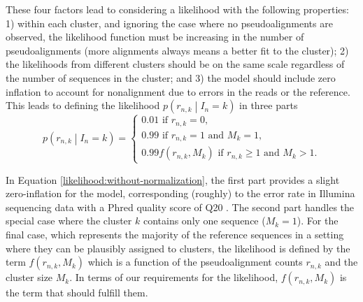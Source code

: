 \documentclass[officiallayout]{tktla}
\begin{document}
These four factors lead to considering a likelihood with the following
properties: 1) within each cluster, and ignoring the case where no
pseudoalignments are observed, the likelihood function must be
increasing in the number of pseudoalignments (more alignments always
means a better fit to the cluster); 2) the likelihoods from different
clusters should be on the same scale regardless of the number of
sequences in the cluster; and 3) the model should include zero
inflation to account for nonalignment due to errors in the reads or
the reference. This leads to defining the likelihood $p\left(r_{n,
  k} \middle| I_{n} = k\right)$ in three parts
\begin{equation}
  \label{likelihood:without-normalization}
  p\left(r_{n, k} \middle| I_{n} = k\right) =
  \begin{cases}
    0.01\text{ if } r_{n, k} = 0, \\
    0.99\text{ if } r_{n, k} = 1 \text{ and } M_{k} = 1, \\
    0.99f\left(r_{n, k}, M_{k}\right)\text{ if } r_{n, k} \geq 1\text{ and } M_{k} > 1.
  \end{cases}
\end{equation}

In Equation \ref{likelihood:without-normalization}, the first part
provides a slight zero-inflation for the model, corresponding
(roughly) to the error rate in Illumina sequencing data with a Phred
quality score of Q20 \citep{ewing1998baseone, ewing1998basetwo}. The
second part handles the special case where the cluster $k$ contains
only one sequence ($M_{k} = 1$). For the final case, which represents
the majority of the reference sequences in a setting where they can be
plausibly assigned to clusters, the likelihood is defined by
the term $f\left(r_{n, k}, M_{k}\right)$ which is a function of the
pseudoalignment counts $r_{n, k}$ and the cluster size $M_{k}$. In
terms of our requirements for the likelihood, $f\left(r_{n, k},
M_{k}\right)$ is the term that should fulfill them.
\end{document}
